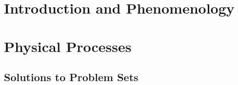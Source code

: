\documentclass{tex/tufte-book} %
\begin{document}

\part{Introduction and Phenomenology}




\part{Physical Processes}





\appendix

\chapter{Solutions to Problem Sets}










\end{document}
